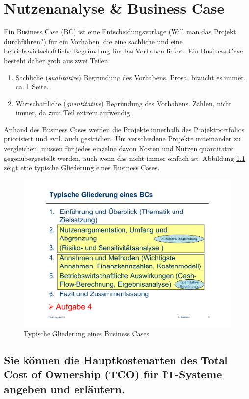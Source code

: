 \chapter{Nutzenanalyse \& Business Case}

Ein Business Case (BC) ist eine Entscheidungsvorlage (Will man das Projekt durchführen?) für ein Vorhaben, die eine sachliche und eine betriebswirtschaftliche Begründung für das Vorhaben liefert. Ein Business Case besteht daher grob aus zwei Teilen:
\begin{enumerate}
	\item Sachliche (\emph{qualitative}) Begründung des Vorhabens. Prosa, braucht es immer, ca. 1 Seite.
	\item Wirtschaftliche (\emph{quantitative}) Begründung des Vorhabens. Zahlen, nicht immer, da zum Teil extrem aufwendig.
\end{enumerate}
Anhand des Business Cases werden die Projekte innerhalb des Projektportfolios priorisiert und evtl. auch gestrichen. Um verschiedene Projekte miteinander zu vergleichen, müssen für jedes einzelne davon Kosten und Nutzen quantitativ gegenübergestellt werden, auch wenn das nicht immer einfach ist. Abbildung \ref{fig:gliederung-business-case} zeigt eine typische Gliederung eines Business Cases.

\begin{figure}[h!]
\centering
\includegraphics[width=0.7\linewidth]{fig/gliederung-business-case}
\caption{Typische Gliederung eines Business Cases}
\label{fig:gliederung-business-case}
\end{figure}

\section{Sie können die Hauptkostenarten des Total Cost of Ownership (TCO) für IT-Systeme angeben und erläutern.}


